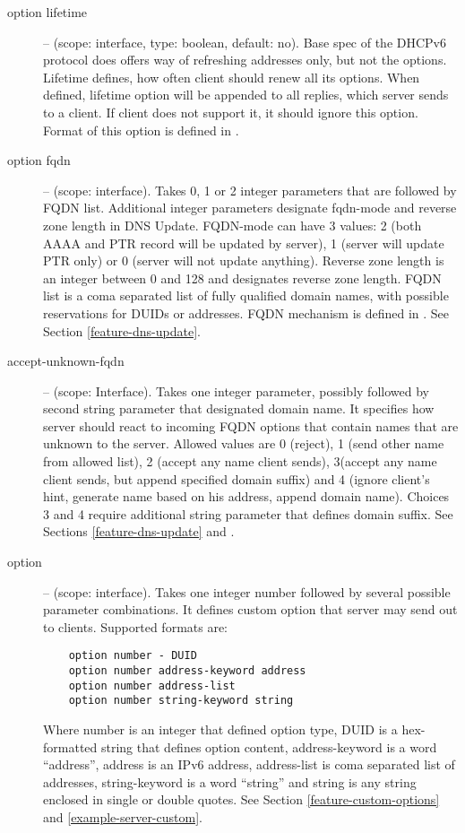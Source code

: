 \begin{description}
 \item[option lifetime] -- (scope: interface, type: boolean, default:
   no). Base spec of the DHCPv6 protocol does offers way of refreshing
   addresses only, but not the options. Lifetime defines, how often
   client should renew all its options. When defined, lifetime option
   will be appended to all replies, which server sends to a client. If
   client does not support it, it should ignore this option. Format of
   this option is defined in \cite{rfc4242}.

 \item[option fqdn] -- (scope: interface). Takes 0, 1 or 2 integer
   parameters that are followed by FQDN list. Additional integer
   parameters designate fqdn-mode and reverse zone length in DNS
   Update. FQDN-mode can have 3 values: 2 (both AAAA and PTR record
   will be updated by server), 1 (server will update PTR only) or
   0 (server will not update anything). Reverse zone length is an
   integer between 0 and 128 and designates reverse zone length. FQDN
   list is a coma separated list of fully qualified domain names, with
   possible reservations for DUIDs or addresses. FQDN mechanism is
   defined in \cite{rfc4704}. See Section \ref{feature-dns-update}.

\item[accept-unknown-fqdn] -- (scope: Interface). Takes one integer
  parameter, possibly followed by second string parameter that
  designated domain name. It specifies how server should react to
  incoming FQDN options that contain names that are unknown to the
  server. Allowed values are 0 (reject), 1 (send other name from
  allowed list), 2 (accept any name client sends), 3(accept any name
  client sends, but append specified domain suffix) and 4 (ignore
  client's hint, generate name based on his address, append domain
  name). Choices 3 and 4 require additional string parameter that
  defines domain suffix. See Sections \ref{feature-dns-update}
  and \label{example-server-fqdn}.

\item[option] -- (scope: interface). Takes one integer number followed
  by several possible parameter combinations. It defines custom
  option that server may send out to clients. Supported formats are:
  \begin{lstlisting}
    option number - DUID
    option number address-keyword address
    option number address-list
    option number string-keyword string
  \end{lstlisting}
Where number is an integer that defined option type, DUID is a
hex-formatted string that defines option content, address-keyword is a
word ``address'', address is an IPv6 address, address-list is coma
separated list of addresses, string-keyword is a word ``string'' and
string is any string enclosed in single or double quotes. See Section
\ref{feature-custom-options} and \ref{example-server-custom}.


\end{description}
